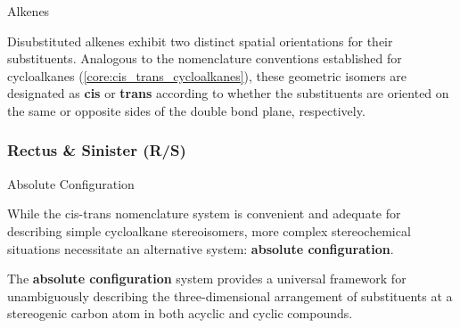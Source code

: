 \documentclass[10pt]{article}
\begin{document}
      \begin{core}[label=core:cis_trans_alkenes]{Alkenes}

        Disubstituted alkenes exhibit two distinct spatial orientations for their substituents. Analogous to the nomenclature conventions established for cycloalkanes (\autoref{core:cis_trans_cycloalkanes}), these geometric isomers are designated as \textbf{cis} or \textbf{trans} according to whether the substituents are oriented on the same or opposite sides of the double bond plane, respectively.

        \vspace{-1.5cm}

      \end{core}

    \subsubsection{Rectus \& Sinister (R/S)}

      \begin{core}[label=core:abs_config]{Absolute Configuration}

        While the cis-trans nomenclature system is convenient and adequate for describing simple cycloalkane stereoisomers, more complex stereochemical situations necessitate an alternative system: \textbf{absolute configuration}.

        The \textbf{absolute configuration} system provides a universal framework for unambiguously describing the three-dimensional arrangement of substituents at a stereogenic carbon atom in both acyclic and cyclic compounds.

      \end{core}
\end{document}
